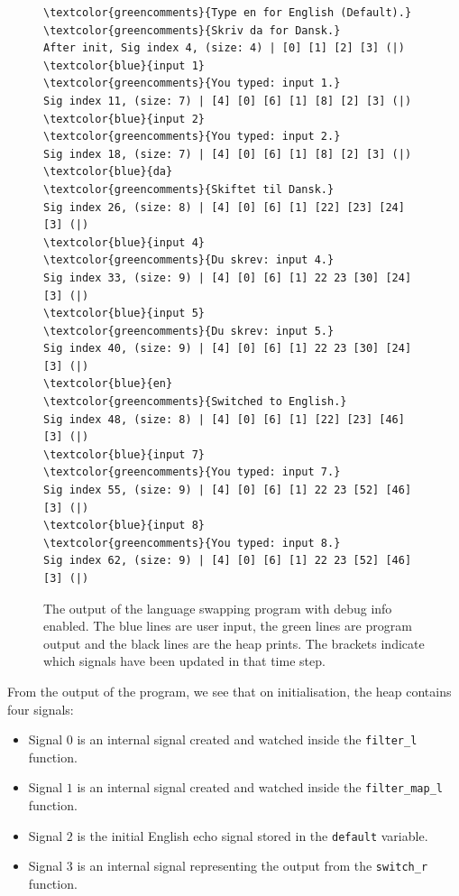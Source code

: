 \begin{figure}
    \begin{Verbatim}[commandchars=\\\{\}]
\textcolor{greencomments}{Type en for English (Default).}
\textcolor{greencomments}{Skriv da for Dansk.}
After init, Sig index 4, (size: 4) | [0] [1] [2] [3] (|)
\textcolor{blue}{input 1}
\textcolor{greencomments}{You typed: input 1.}
Sig index 11, (size: 7) | [4] [0] [6] [1] [8] [2] [3] (|) 
\textcolor{blue}{input 2}
\textcolor{greencomments}{You typed: input 2.}
Sig index 18, (size: 7) | [4] [0] [6] [1] [8] [2] [3] (|) 
\textcolor{blue}{da}
\textcolor{greencomments}{Skiftet til Dansk.}
Sig index 26, (size: 8) | [4] [0] [6] [1] [22] [23] [24] [3] (|) 
\textcolor{blue}{input 4}
\textcolor{greencomments}{Du skrev: input 4.}
Sig index 33, (size: 9) | [4] [0] [6] [1] 22 23 [30] [24] [3] (|) 
\textcolor{blue}{input 5}
\textcolor{greencomments}{Du skrev: input 5.}
Sig index 40, (size: 9) | [4] [0] [6] [1] 22 23 [30] [24] [3] (|) 
\textcolor{blue}{en}
\textcolor{greencomments}{Switched to English.}
Sig index 48, (size: 8) | [4] [0] [6] [1] [22] [23] [46] [3] (|) 
\textcolor{blue}{input 7}
\textcolor{greencomments}{You typed: input 7.}
Sig index 55, (size: 9) | [4] [0] [6] [1] 22 23 [52] [46] [3] (|) 
\textcolor{blue}{input 8}
\textcolor{greencomments}{You typed: input 8.}
Sig index 62, (size: 9) | [4] [0] [6] [1] 22 23 [52] [46] [3] (|)
    \end{Verbatim}
    \caption{The output of the language swapping program with debug info enabled. The blue lines are user input, the green lines are program output and the black lines are the heap prints. The brackets indicate which signals have been updated in that time step.}
    \label{fig:heap_print}
\end{figure}

From the output of the program, we see that on initialisation, the heap contains four signals:

\begin{itemize}
    \item Signal $0$ is an internal signal created and watched inside the \texttt{filter\_l} function.
    \item Signal $1$ is an internal signal created and watched inside the \texttt{filter\_map\_l} function.
    \item Signal $2$ is the initial English echo signal stored in the \texttt{default} variable.
    \item Signal $3$ is an internal signal representing the output from the \texttt{switch\_r} function.
\end{itemize}

